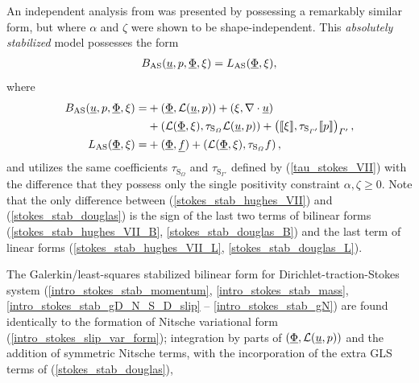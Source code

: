 An independent analysis from \citet{hughes_1987} was presented by \citet{douglas_1989} possessing a remarkably similar form, but where $\alpha$ and $\zeta$ were shown to be shape-independent.  This \emph{absolutely stabilized} model possesses the form
\begin{align}
  \label{stokes_stab_douglas}
  B_{\text{AS}}(\underline{u},p,\underline{\Phi}, \xi) = L_{\text{AS}}(\underline{\Phi}, \xi),
\end{align}
where
\begin{align}
  \label{stokes_stab_douglas_B}
  B_{\text{AS}}(\underline{u},p,\underline{\Phi}, \xi) = &+ \left( \underline{\Phi}, \mathcal{L} (\underline{u}, p) \right) + \left( \xi, \nabla \cdot \underline{u} \right) \notag \\
  &+ \left( \mathcal{L} (\underline{\Phi}, \xi), \tau_{\text{S}_{\varOmega}} \mathcal{L} (\underline{u}, p) \right) + \left( \llbracket \xi \rrbracket, \tau_{\text{S}_{\varGamma'}} \llbracket p \rrbracket \right)_{\varGamma'}, \\
  \label{stokes_stab_douglas_L}
  L_{\text{AS}}(\underline{\Phi}, \xi) = &+ ( \underline{\Phi}, \underline{f} ) + \left( \mathcal{L} (\underline{\Phi}, \xi), \tau_{\text{S}_{\varOmega}} f \right),
\end{align}
and utilizes the same coefficients $\tau_{\text{S}_{\Omega}}$ and $\tau_{\text{S}_{\Gamma'}}$ defined by (\ref{tau_stokes_VII}) with the difference that they possess only the single positivity constraint $\alpha, \zeta \geq 0$.  Note that the only difference between (\ref{stokes_stab_hughes_VII}) and (\ref{stokes_stab_douglas}) is the sign of the last two terms of bilinear forms (\ref{stokes_stab_hughes_VII_B}, \ref{stokes_stab_douglas_B}) and the last term of linear forms (\ref{stokes_stab_hughes_VII_L}, \ref{stokes_stab_douglas_L}).
  
The Galerkin/least-squares stabilized bilinear form for Dirichlet-traction-Stokes system (\ref{intro_stokes_stab_momentum}, \ref{intro_stokes_stab_mass}, \ref{intro_stokes_stab_gD_N_S_D_slip} -- \ref{intro_stokes_stab_gN}) are found identically to the formation of Nitsche variational form (\ref{intro_stokes_slip_var_form}); integration by parts of $(\underline{\Phi}, \mathcal{L} (\underline{u},p))$ and the addition of symmetric Nitsche terms, with the incorporation of the extra GLS terms of (\ref{stokes_stab_douglas}),

